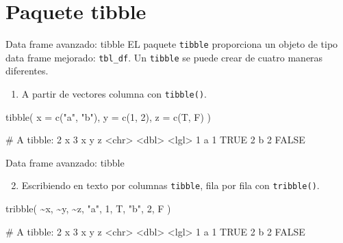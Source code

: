 \documentclass[
  ignorenonframetext,
  aspectratio=169]{beamer}
\newenvironment{Shaded}{\begin{snugshade}}{\end{snugshade}}
\newcommand{\AttributeTok}[1]{\textcolor[rgb]{0.77,0.63,0.00}{#1}}
\newcommand{\DecValTok}[1]{\textcolor[rgb]{0.00,0.00,0.81}{#1}}
\newcommand{\FunctionTok}[1]{\textcolor[rgb]{0.00,0.00,0.00}{#1}}
\newcommand{\NormalTok}[1]{#1}
\newcommand{\SpecialCharTok}[1]{\textcolor[rgb]{0.00,0.00,0.00}{#1}}
\newcommand{\StringTok}[1]{\textcolor[rgb]{0.31,0.60,0.02}{#1}}
\providecommand{\tightlist}{%
  \setlength{\itemsep}{0pt}\setlength{\parskip}{0pt}}
\let\oldverbatim\verbatim
\let\endoldverbatim\endverbatim
\renewenvironment{verbatim}{\tiny\oldverbatim}{\endoldverbatim}
\begin{document}
\hypertarget{paquete-tibble}{%
\section{Paquete tibble}\label{paquete-tibble}}

\begin{frame}[fragile]{Data frame avanzado: tibble}
\protect\hypertarget{data-frame-avanzado-tibble}{}
EL paquete \texttt{tibble} proporciona un objeto de tipo data frame
mejorado: \texttt{tbl\_df}. Un \texttt{tibble} se puede crear de cuatro
maneras diferentes.

\begin{enumerate}
\tightlist
\item
  A partir de vectores columna con \texttt{tibble()}.
\end{enumerate}

\begin{Shaded}
\begin{Highlighting}[]
\FunctionTok{tibble}\NormalTok{(}
  \AttributeTok{x =} \FunctionTok{c}\NormalTok{(}\StringTok{"a"}\NormalTok{, }\StringTok{"b"}\NormalTok{),}
  \AttributeTok{y =} \FunctionTok{c}\NormalTok{(}\DecValTok{1}\NormalTok{, }\DecValTok{2}\NormalTok{),}
  \AttributeTok{z =} \FunctionTok{c}\NormalTok{(T, F)}
\NormalTok{)}
\end{Highlighting}
\end{Shaded}

\begin{verbatim}
# A tibble: 2 x 3
  x         y z    
  <chr> <dbl> <lgl>
1 a         1 TRUE 
2 b         2 FALSE
\end{verbatim}
\end{frame}

\begin{frame}[fragile]{Data frame avanzado: tibble}
\protect\hypertarget{data-frame-avanzado-tibble-1}{}
\begin{enumerate}
\setcounter{enumi}{1}
\tightlist
\item
  Escribiendo en texto por columnas \texttt{tibble}, fila por fila con
  \texttt{tribble()}.
\end{enumerate}

\begin{Shaded}
\begin{Highlighting}[]
\FunctionTok{tribble}\NormalTok{(}
  \SpecialCharTok{\textasciitilde{}}\NormalTok{x, }\SpecialCharTok{\textasciitilde{}}\NormalTok{y, }\SpecialCharTok{\textasciitilde{}}\NormalTok{z,}
  \StringTok{"a"}\NormalTok{, }\DecValTok{1}\NormalTok{, T,}
  \StringTok{"b"}\NormalTok{, }\DecValTok{2}\NormalTok{, F}
\NormalTok{)}
\end{Highlighting}
\end{Shaded}

\begin{verbatim}
# A tibble: 2 x 3
  x         y z    
  <chr> <dbl> <lgl>
1 a         1 TRUE 
2 b         2 FALSE
\end{verbatim}
\end{frame}
\end{document}
